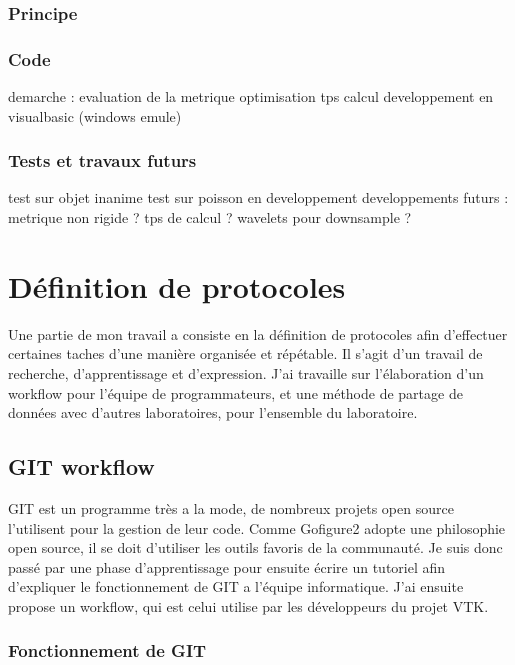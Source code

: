 \subsubsection{Principe}


\subsubsection{Code}

demarche : evaluation de la metrique
optimisation tps calcul
developpement en visualbasic (windows emule)

\subsubsection{Tests et travaux futurs}
test sur objet inanime
test sur poisson en developpement
developpements futurs :
metrique non rigide ?
tps de calcul ?
wavelets pour downsample ?


\section{Définition de protocoles}

Une partie de mon travail a consiste en la définition de protocoles afin d'effectuer certaines taches d'une manière organisée et répétable. Il s'agit d'un travail de recherche, d'apprentissage et d'expression. J'ai travaille sur l'élaboration d'un workflow pour l'équipe de programmateurs, et une méthode de partage de données avec d'autres laboratoires, pour l'ensemble du laboratoire.

\subsection{GIT workflow}

GIT est un programme très a la mode, de nombreux projets open source l'utilisent pour la gestion de leur code. Comme Gofigure2 adopte une philosophie open source, il se doit d'utiliser les outils favoris de la communauté.
Je suis donc passé par une phase d'apprentissage pour ensuite écrire un tutoriel afin d'expliquer le fonctionnement de GIT a l'équipe informatique. J'ai ensuite propose un workflow, qui est celui utilise par les développeurs du projet VTK.

\subsubsection{Fonctionnement de GIT}


